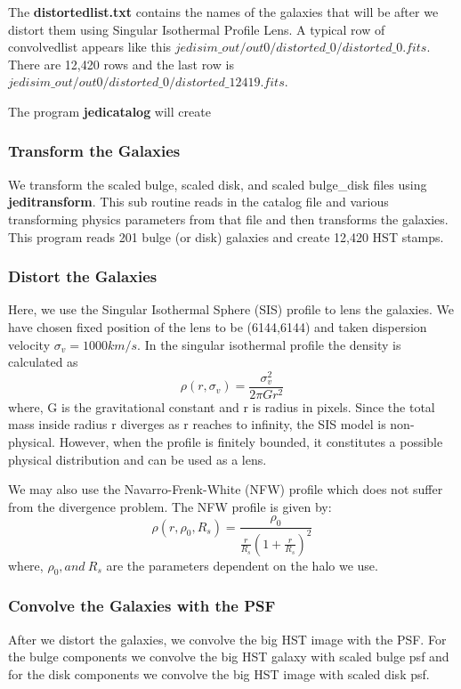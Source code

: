 The \textbf{distortedlist.txt} contains the names of the galaxies that will be after we distort them using Singular Isothermal Profile Lens. A typical row of convolvedlist appears like this $jedisim\_out/out0/distorted\_0/distorted\_0.fits$. There are 12,420 rows and the last row is $jedisim\_out/out0/distorted\_0/distorted\_12419.fits$.

The program \textbf{jedicatalog} will create

\subsubsection{Transform the Galaxies}
We transform the scaled bulge, scaled disk, and scaled bulge\_disk files using \textbf{jeditransform}. This sub routine reads in the catalog file and various transforming physics parameters from that file and then transforms the galaxies. This program reads 201 bulge (or disk) galaxies and create 12,420 HST stamps.

\subsubsection{Distort the Galaxies}
Here, we use the Singular Isothermal Sphere (SIS) profile to 
lens the galaxies. We have chosen fixed position of the lens
to be (6144,6144) and taken dispersion velocity $\sigma_v = 1000 km/s$. In the singular isothermal profile the density is 
calculated as
\begin{equation}
\rho(r,\sigma_v) = \frac{\sigma_v^2}{2\pi Gr^2}
\end{equation}
where, G is the gravitational constant and r is radius in pixels. Since the total mass inside radius r diverges as r reaches to infinity, the SIS model is non-physical. However, when the profile is finitely bounded, it constitutes a possible physical distribution and can be used as a lens.

We may also use the Navarro-Frenk-White (NFW) profile which does
not suffer from the divergence problem. The NFW profile is 
given by:
\begin{equation}
\rho(r,\rho_0,R_s) = \frac{\rho_0}{\frac{r}{R_s} (1 + \frac{r}{R_s})^2}
\end{equation}
where, $\rho_0, and\ R_s$ are the parameters dependent on the halo we use.

\subsubsection{Convolve the Galaxies with the PSF}
After we distort the galaxies, we convolve the big HST image with the PSF. For the bulge components we convolve the big HST galaxy with scaled bulge psf and for the disk components we convolve the big HST image with scaled disk psf.

